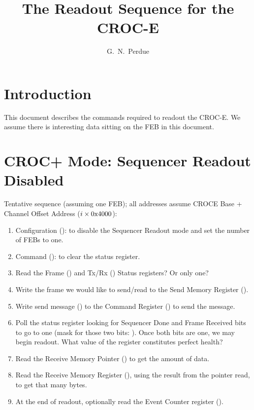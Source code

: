 




\linenumbers

\title{The Readout Sequence for the \minerva CROC-E}

\author[1]{G.~N.~Perdue}
\affil[1]{\Rochester}

\maketitle


\section{Introduction}
\label{sec:introduction}

This document describes the commands required to readout the \minerva CROC-E.
We assume there is interesting data sitting on the FEB in this document.

\section{CROC+ Mode: Sequencer Readout Disabled}
\label{sec:seqreaddisab}

Tentative sequence (assuming one FEB); all addresses assume CROCE Base + Channel Offset Address ($i \times \text{0x4000}$):
\begin{enumerate}
\item Configuration ():  to disable the Sequencer Readout mode and set the number of FEBs to one.
\item Command ():  to clear the status register.
\item Read the Frame () and Tx/Rx () Status registers? Or only one?
\item Write the frame we would like to send/read to the Send Memory Register (). 
\item Write send message () to the Command Register () to send the message.
\item Poll the status register looking for Sequencer Done and Frame Received bits to go to one (mask for those two bits: ). Once both bits are one, we may begin readout. What value of the register constitutes perfect health?
\item Read the Receive Memory Pointer () to get the amount of data.
\item Read the Receive Memory Register (), using the result from the pointer read, to get that many bytes. 
\item At the end of readout, optionally read the Event Counter register ().
\end{enumerate}

